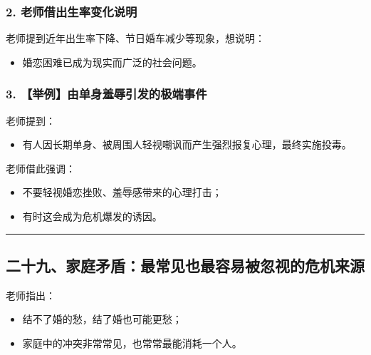 \documentclass[
  chinese,
  9pt,
  a4paper,
]{ctexart}
\providecommand{\tightlist}{%
  \setlength{\itemsep}{0pt}\setlength{\parskip}{0pt}}
\begin{document}
\subsubsection{2.
老师借出生率变化说明}\label{ux8001ux5e08ux501fux51faux751fux7387ux53d8ux5316ux8bf4ux660e}

老师提到近年出生率下降、节日婚车减少等现象，想说明：

\begin{itemize}
\tightlist
\item
  婚恋困难已成为现实而广泛的社会问题。
\end{itemize}

\subsubsection{3.
【举例】由单身羞辱引发的极端事件}\label{ux4e3eux4f8bux7531ux5355ux8eabux7f9eux8fb1ux5f15ux53d1ux7684ux6781ux7aefux4e8bux4ef6}

老师提到：

\begin{itemize}
\tightlist
\item
  有人因长期单身、被周围人轻视嘲讽而产生强烈报复心理，最终实施投毒。
\end{itemize}

老师借此强调：

\begin{itemize}
\tightlist
\item
  不要轻视婚恋挫败、羞辱感带来的心理打击；
\item
  有时这会成为危机爆发的诱因。
\end{itemize}

\begin{center}\rule{0.5\linewidth}{0.5pt}\end{center}

\subsection{二十九、家庭矛盾：最常见也最容易被忽视的危机来源}\label{ux4e8cux5341ux4e5dux5bb6ux5eadux77dbux76feux6700ux5e38ux89c1ux4e5fux6700ux5bb9ux6613ux88abux5ffdux89c6ux7684ux5371ux673aux6765ux6e90}

老师指出：

\begin{itemize}
\tightlist
\item
  结不了婚的愁，结了婚也可能更愁；
\item
  家庭中的冲突非常常见，也常常最能消耗一个人。
\end{itemize}
\end{document}
